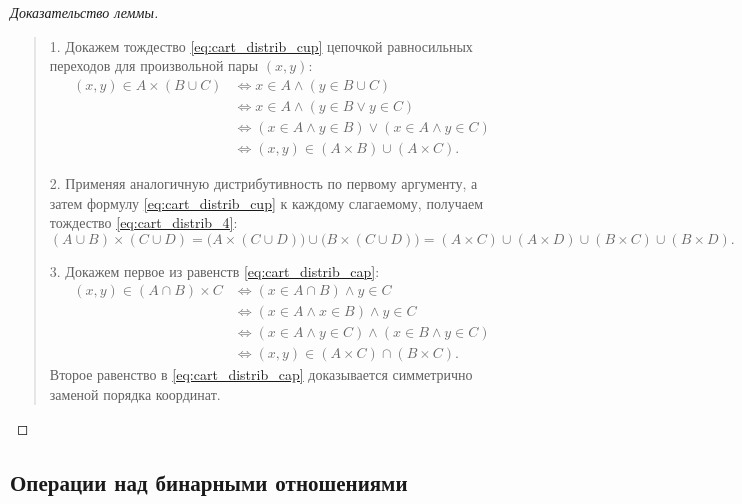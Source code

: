 \begin{proof}[Доказательство леммы]~\\
    \begin{quote}
        1. Докажем тождество \eqref{eq:cart_distrib_cup} цепочкой 
        равносильных переходов для произвольной пары $(x, y)$:
        \begin{align*}
            (x, y) \in A \times (B \cup C) 
            &\iff x \in A \land (y \in B \cup C) \\
            &\iff x \in A \land (y \in B \lor y \in C) \\
            &\iff (x \in A \land y \in B) \lor (x \in A \land y \in C) \\
            &\iff (x, y) \in (A \times B) \cup (A \times C).
        \end{align*}

        2. Применяя аналогичную дистрибутивность по первому аргументу, а 
        затем формулу \eqref{eq:cart_distrib_cup} к каждому слагаемому, 
        получаем тождество \eqref{eq:cart_distrib_4}:
        \[
            (A \cup B) \times (C \cup D) = 
            \bigl(A \times (C \cup D)\bigr) \cup 
            \bigl(B \times (C \cup D)\bigr) = 
            (A \times C) \cup (A \times D) \cup (B \times C) \cup (B \times D).
        \]

        3. Докажем первое из равенств \eqref{eq:cart_distrib_cap}:
        \begin{align*}
            (x, y) \in (A \cap B) \times C 
            &\iff (x \in A \cap B) \land y \in C \\
            &\iff (x \in A \land x \in B) \land y \in C \\
            &\iff (x \in A \land y \in C) \land (x \in B \land y \in C) \\
            &\iff (x, y) \in (A \times C) \cap (B \times C).
        \end{align*}
        Второе равенство в \eqref{eq:cart_distrib_cap} доказывается 
        симметрично заменой порядка координат.
    \end{quote}
\end{proof}

\subsection{Операции над бинарными отношениями}


